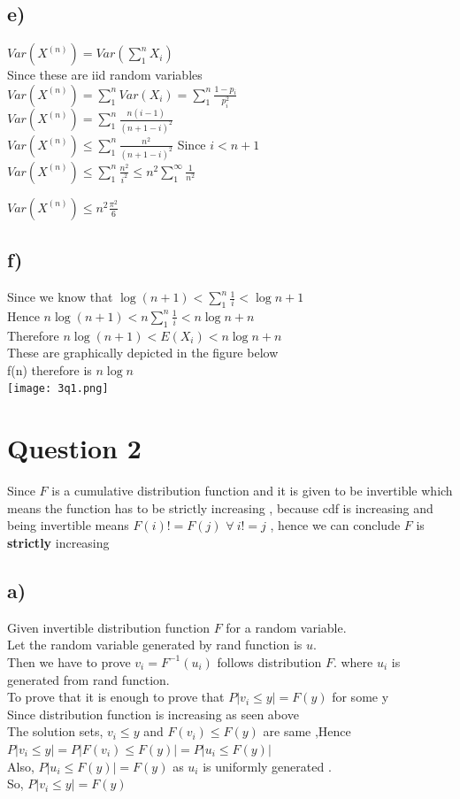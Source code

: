 \documentclass{article}
\begin{document}
\subsection*{e)}
$Var(X^{(n)}) = Var(\sum_1^n X_i)$\\
Since these are iid random variables\\
$Var(X^{(n)}) = \sum_1^n Var(X_i) = \sum_1^n\frac{1-p_i}{p_i^2} $\\ 
$Var(X^{(n)}) = \sum_1^n \frac{n(i-1)}{(n+1-i)^2}$\\
$Var(X^{(n)}) \leq \sum_1^n\frac{n^2}{(n+1-i)^2}$ Since $i < n+1$\\ 
$Var(X^{(n)}) \leq \sum_1^n\frac{n^2}{i^2} \leq n^2\sum_1^{\infty} \frac{1}{n^2} $\par 
$Var(X^{(n)}) \leq n^2 \frac{\pi^2}{6}$
\subsection*{f)}
Since we know that $\log(n+1) < \sum_1^n \frac{1}{i} < \log n + 1$\\
Hence $n\log(n+1) < n\sum_1^n \frac{1}{i} < n\log n + n$\\
Therefore $n\log(n+1) < E(X_i) < n\log n + n$\\
These are graphically depicted in the figure below\\
f(n) therefore is $n\log n $\\
    {\texttt{[image: 3q1.png]}}
\section*{Question 2}
Since $F$ is a cumulative distribution function and it is given to be invertible which means the function has to be strictly increasing , because cdf is increasing and being invertible means $F(i)!=F(j)$ $ \forall \ i!=j$ , hence we can conclude $F $ is \textbf{strictly }increasing
\subsection*{a)}
Given invertible distribution function $F$ for a random variable.\\ Let the random variable generated by rand function is $u$.\\
Then we have to prove $v_{i} = F^{-1}(u_i)$ follows distribution $F$. where $u_i$ is generated from rand function.\\
To prove that it is enough to prove
 that $P|v_i\leq y| = F(y)$ for some y\\
Since distribution function is increasing as seen above\\
The solution sets, $v_i \leq y$ and $F(v_i) \leq F(y)$ are same ,Hence
\\ $P|v_i \leq y| = P|F(v_i) \leq F(y)| = P|u_i \leq F(y)|$\\
Also, $P|u_i \leq F(y)|=F(y)$ as $u_i$ is uniformly generated .\\
So, $P|v_i\leq y| = F(y)$
\end{document}
